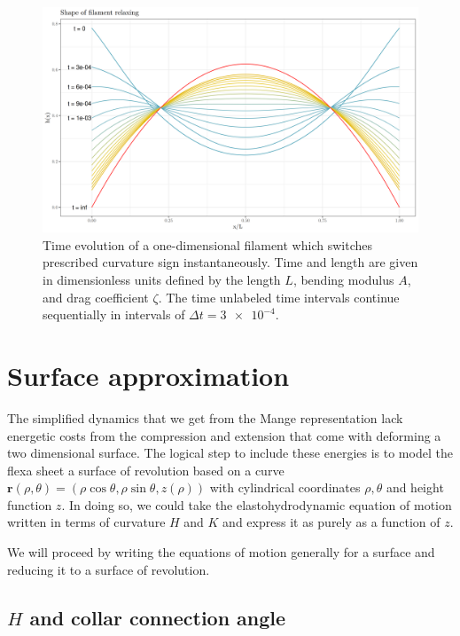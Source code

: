 \begin{figure}[bthp]
    \centering
    \includegraphics[width=\textwidth]{shapes.png}
    \caption{Time evolution of a one-dimensional filament which switches prescribed curvature sign instantaneously. Time and length are given in dimensionless units defined by the length $L$, bending modulus $A$, and drag coefficient $\zeta$. The time unlabeled time intervals continue sequentially in intervals of $\Delta t = \num{3e-4}$.}
    \label{fig:shapes}
\end{figure}

\section{Surface approximation}

The simplified dynamics that we get from the Mange representation lack energetic costs from the compression and extension that come with deforming a two dimensional surface. The logical step to include these energies is to model the flexa sheet a surface of revolution based on a curve $\bm{r}(\rho, \theta)=(\rho \cos \theta, \rho \sin \theta, z(\rho))$ with cylindrical coordinates $\rho, \theta$ and height function $z$. In doing so, we could take the elastohydrodynamic equation of motion written in terms of curvature $H$ and $K$ and express it as purely as a function of $z$.

We will proceed by writing the equations of motion generally for a surface and reducing it to a surface of revolution.

\subsection{$H$ and collar connection angle}

